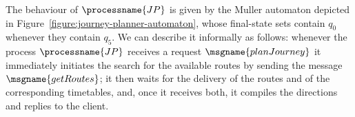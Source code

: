 \documentclass{LMCS}
\begin{document}
\begin{exa}
  The behaviour of \(\processname{JP}\) is given by the Muller automaton depicted in Figure~\ref{figure:journey-planner-automaton}, whose final-state sets contain \(q_{0}\) whenever they contain \(q_{5}\).
  We can describe it informally as follows: whenever the process \(\processname{JP}\) receives a request \(\msgname{planJourney}\) it immediately initiates the search for the available routes by sending the message \(\msgname{getRoutes}\); it then waits for the delivery of the routes and of the corresponding timetables, and, once it receives both, it compiles the directions and replies to the client.

  \begin{figure}[h]
    \centering
    
\end{figure}
\end{exa}
\end{document}
